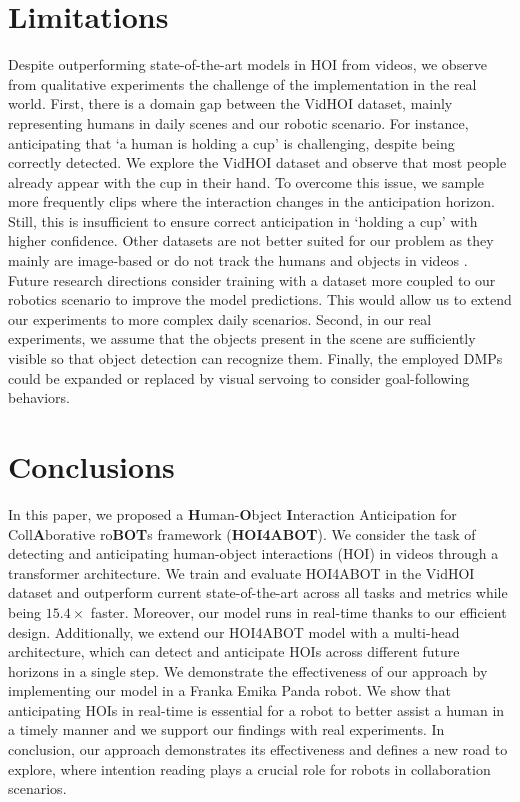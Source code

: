 \documentclass{article}
\begin{document}
\section{Limitations} Despite outperforming state-of-the-art models in HOI from videos, we observe from qualitative experiments the challenge of the implementation in the real world. First, there is a domain gap between the VidHOI dataset, mainly representing humans in daily scenes and our robotic scenario. For instance, anticipating that `a human is holding a cup' is challenging, despite being correctly detected. We explore the VidHOI dataset and observe that most people already appear with the cup in their hand. To overcome this issue, we sample more frequently clips where the interaction changes in the anticipation horizon. Still, this is insufficient to ensure correct anticipation in `holding a cup' with higher confidence. Other datasets are not better suited for our problem as they mainly are image-based \citep{Xu2018, gupta2015visual} or do not track the humans and objects in videos \citep{ji2020action}. Future research directions consider training with a dataset more coupled to our robotics scenario to improve the model predictions. This would allow us to extend our experiments to more complex daily scenarios. Second, in our real experiments, we assume that the objects present in the scene are sufficiently visible so that object detection can recognize them. Finally, the employed DMPs could be expanded or replaced by visual servoing to consider goal-following behaviors.

\section{Conclusions} In this paper, we proposed a \textbf{H}uman-\textbf{O}bject \textbf{I}nteraction Anticipation for Coll\textbf{A}borative ro\textbf{BOT}s framework (\textbf{HOI4ABOT}). We consider the task of detecting and anticipating human-object interactions (HOI) in videos through a transformer architecture. We train and evaluate HOI4ABOT in the VidHOI dataset and outperform current state-of-the-art across all tasks and metrics while being $15.4 \times$ faster. Moreover, our model runs in real-time thanks to our efficient design. Additionally, we extend our HOI4ABOT model with a multi-head architecture, which can detect and anticipate HOIs across different future horizons in a single step. We demonstrate the effectiveness of our approach by implementing our model in a Franka Emika Panda robot. We show that anticipating HOIs in real-time is essential for a robot to better assist a human in a timely manner and we support our findings with real experiments. In conclusion, our approach demonstrates its effectiveness and defines a new road to explore, where intention reading plays a crucial role for robots in collaboration scenarios. 
\end{document}
